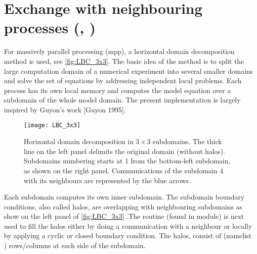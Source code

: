 \documentclass[../main/NEMO_manual]{subfiles}
\begin{document}
\section[Exchange with neighbouring processes (\textit{lbclnk.F90}, \textit{lib\_mpp.F90})]{Exchange with neighbouring processes (\protect{}, \protect{})}
\label{sec:LBC_mpp}

\begin{listing}
  \caption{}
  \label{lst:nammpp}
\end{listing}

For massively parallel processing (mpp), a horizontal domain decomposition method is used, see \autoref{fig:LBC_3x3}.
The basic idea of the method is to split the large computation domain of a numerical experiment into several smaller domains and solve the set of equations by addressing independent local problems.
Each process has its own local memory and computes the model equation over a subdomain of the whole model domain.
The present implementation is largely inspired by Guyon's work [Guyon 1995].

\begin{figure}[h]
  \centering
  \texttt{[image: LBC\_3x3]}
  \caption{Horizontal domain decomposition in $3 \times 3$ subdomains. The thick line on the left panel delimits the original domain (without halos). Subdomains numbering starts at 1 from the bottom-left subdomain, as shown on the right panel. Communications of the subdomain 4 with its neighbours are represented by the blue arrows.}
  \label{fig:LBC_3x3}
\end{figure}

Each subdomain computes its own inner subdomain. The subdomain boundary conditions, also called halos, are overlapping with neighbouring subdomains as show on the left panel of \autoref{fig:LBC_3x3}. The  routine (found in  module) is next used to fill the halos either by doing a communication with a neighbour or locally by applying a cyclic or closed boundary condition. The halos, consist of  (namelist ) rows/columns at each side of the subdomain.
\end{document}
